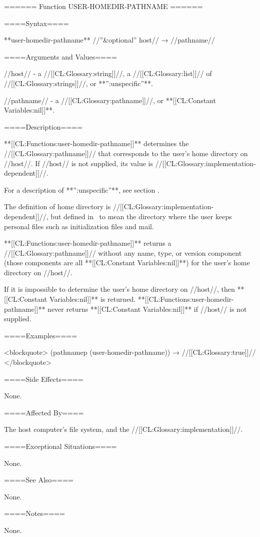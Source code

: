 ====== Function USER-HOMEDIR-PATHNAME ======

====Syntax====

**user-homedir-pathname** //''&optional'' host// → //pathname//

====Arguments and Values====

//host// - a //[[CL:Glossary:string]]//, a //[[CL:Glossary:list]]// of //[[CL:Glossary:strings]]//, or **'':unspecific''**.

//pathname// - a //[[CL:Glossary:pathname]]//, or **[[CL:Constant Variables:nil]]**.

====Description====

**[[CL:Functions:user-homedir-pathname]]** determines the //[[CL:Glossary:pathname]]// that corresponds to the user's home directory on //host//. If //host// is not supplied, its value is //[[CL:Glossary:implementation-dependent]]//.

For a description of **'':unspecific''**, see section {\secref\PathnameComponents}.

The definition of home directory is //[[CL:Glossary:implementation-dependent]]//, but defined in \clisp\ to mean the directory where the user keeps personal files such as initialization files and mail.

**[[CL:Functions:user-homedir-pathname]]** returns a //[[CL:Glossary:pathname]]// without any name, type, or version component (those components are all **[[CL:Constant Variables:nil]]**) for the user's home directory on //host//.

If it is impossible to determine the user's home directory on //host//, then **[[CL:Constant Variables:nil]]** is returned. **[[CL:Functions:user-homedir-pathname]]** never returns **[[CL:Constant Variables:nil]]** if //host// is not supplied.

====Examples====

<blockquote> (pathnamep (user-homedir-pathname)) → //[[CL:Glossary:true]]// </blockquote>

====Side Effects====

None.

====Affected By====

The host computer's file system, and the //[[CL:Glossary:implementation]]//.

====Exceptional Situations====

None.

====See Also====

None.

====Notes====

None.


